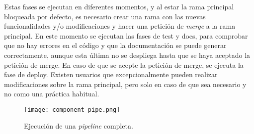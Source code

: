 Estas fases se ejecutan en diferentes momentos, y al estar la rama principal bloqueada
por defecto, es necesario crear una rama con las nuevas funcionalidades y/o modificaciones
y hacer una petición de \textit{merge} a la rama principal. En este momento se ejecutan las fases
de test y docs, para comprobar que no hay errores en el código y que la documentación
se puede generar correctamente, aunque esta última no se despliega hasta que se haya
aceptado la petición de merge. En caso de que se acepte la petición de merge, se ejecuta
la fase de deploy. Existen usuarios que excepcionalmente pueden realizar modificaciones
sobre la rama principal, pero solo en caso de que sea necesario y no como una práctica
habitual. 

\begin{figure}[!h]
    \centering
    \texttt{[image: component\_pipe.png]}
    \caption{Ejecución de una \textit{pipeline} completa.}
    \label{fig:component-pipeline}
\end{figure}
